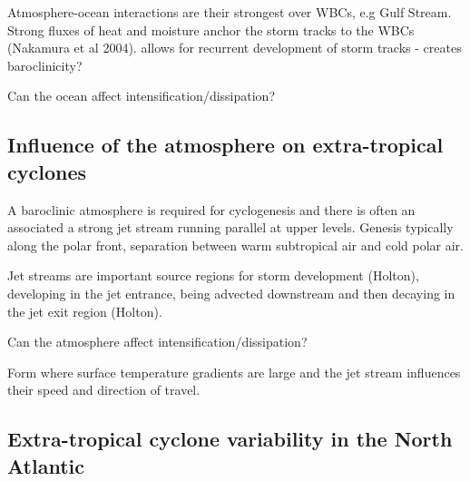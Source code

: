 Atmosphere-ocean interactions are their strongest over WBCs, e.g Gulf Stream. Strong fluxes of heat and moisture anchor the storm tracks to the WBCs (Nakamura et al 2004). allows for recurrent development of storm tracks - creates baroclinicity?

Can the ocean affect intensification/dissipation?


\subsection{Influence of the atmosphere on extra-tropical cyclones} \label{etc_atm}

A baroclinic atmosphere is required for cyclogenesis and there is often an associated a strong jet stream running parallel at upper levels. Genesis typically along the polar front, separation between warm subtropical air and cold polar air.

Jet streams are important source regions for storm development (Holton), developing in the jet entrance, being advected downstream and then decaying in the jet exit region (Holton).

Can the atmosphere affect intensification/dissipation?

Form where surface temperature gradients are large and the jet stream influences their speed and direction of travel. 


\subsection {Extra-tropical cyclone variability in the North Atlantic} \label{etc_var} %


